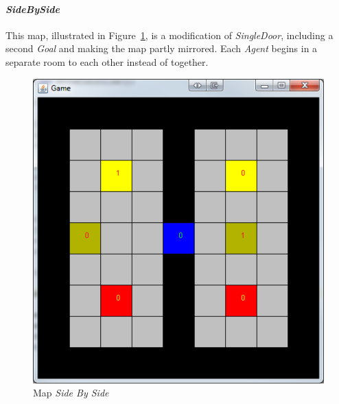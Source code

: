 \documentclass{IEEEtran}
\begin{document}
\paragraph{\emph{SideBySide}} This map, illustrated in Figure~\ref{SideBySide}, is a modification of \emph{SingleDoor}, including a second \emph{Goal} and making the map partly mirrored. Each \emph{Agent} begins in a separate room to each other instead of together.
\begin{figure}[!t]
\centering
\includegraphics[scale=0.35]{level4}
\caption{Map \textit{Side By Side}}
\label{SideBySide}
\end{figure}
\end{document}
